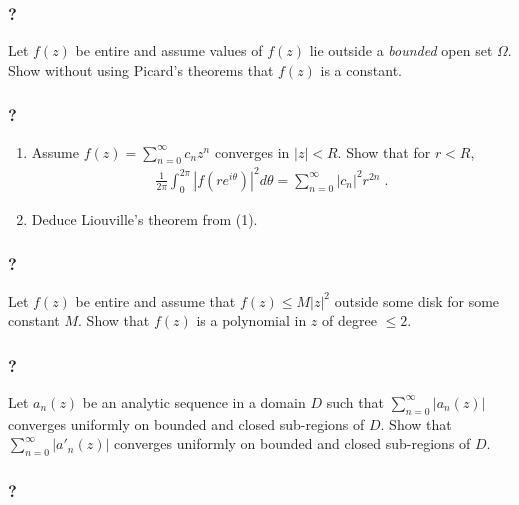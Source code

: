 \hypertarget{section-115}{%
\subsubsection{?}\label{section-115}}

Let \(f(z)\) be entire and assume values of \(f(z)\) lie outside a
\emph{bounded} open set \(\Omega\). Show without using Picard's theorems
that \(f(z)\) is a constant.

\hypertarget{section-116}{%
\subsubsection{?}\label{section-116}}

\begin{enumerate}
\def\labelenumi{(\arabic{enumi})}
\item
  Assume \(\displaystyle f(z) = \sum_{n=0}^\infty c_n z^n\) converges in
  \(|z| < R\). Show that for \(r <R\),
  \begin{align*}\frac{1}{2 \pi} \int_0^{2 \pi} |f(r e^{i \theta})|^2 d \theta
  = \sum_{n=0}^\infty |c_n|^2 r^{2n} \; .\end{align*}
\item
  Deduce Liouville's theorem from (1).
\end{enumerate}

\hypertarget{section-117}{%
\subsubsection{?}\label{section-117}}

Let \(f(z)\) be entire and assume that \(f(z) \leq M |z|^2\) outside
some disk for some constant \(M\). Show that \(f(z)\) is a polynomial in
\(z\) of degree \(\leq 2\).

\hypertarget{section-118}{%
\subsubsection{?}\label{section-118}}

Let \(a_n(z)\) be an analytic sequence in a domain \(D\) such that
\(\displaystyle \sum_{n=0}^\infty |a_n(z)|\) converges uniformly on
bounded and closed sub-regions of \(D\). Show that
\(\displaystyle \sum_{n=0}^\infty |a'_n(z)|\) converges uniformly on
bounded and closed sub-regions of \(D\).

\hypertarget{section-119}{%
\subsubsection{?}\label{section-119}}

